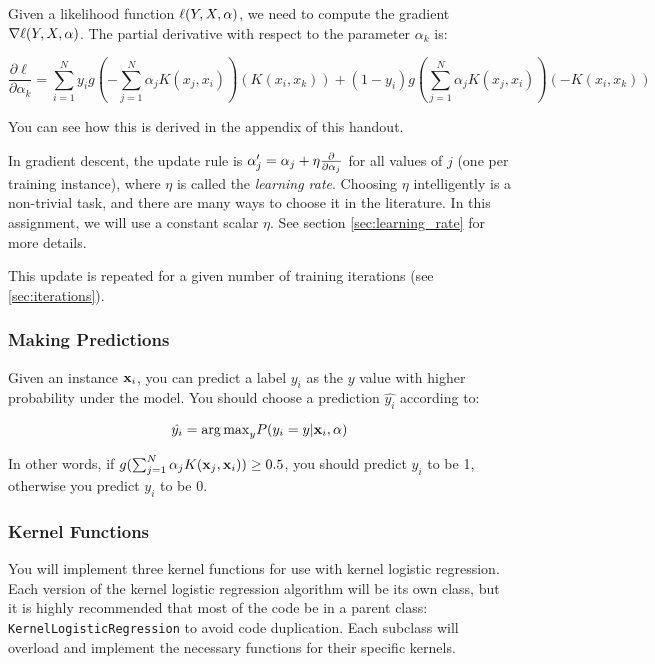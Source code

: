 \documentclass[11pt]{article}
\newcommand{\va}{{\bf \alpha}}
\newcommand{\vx}{{\bf x}}
\newcommand{\vxi}{{\bf x}_i}
\newcommand{\yi}{y_i}
\newcommand{\pder}[2][]{\frac{\partial#1}{\partial#2}}
\newcommand{\code}[1]{{\footnotesize \tt #1}}
\begin{document}
Given a likelihood function $\ell(Y,X,\va)$, we need to compute the gradient $\nabla \ell(Y,X,\va)$. The partial derivative with respect to the parameter $\alpha_k$ is:

\begin{equation}
\pder[\ell]{\alpha_k} = \sum_{i=1}^{N} y_i g\left(-\textstyle \sum_{j=1}^{N} \alpha_j K(x_j, x_i)\right) \left(K(x_i, x_k)\right) 
+ (1 - y_i) g\left(\textstyle \sum_{j=1}^{N} \alpha_j K(x_j, x_i)\right) \left(-K(x_i, x_k)\right) 
\end{equation}

\noindent You can see how this is derived in the appendix of this handout.

In gradient descent, the update rule is $\va'_j = \va_j + \eta \pder{\va_j}$ for all values of $j$ (one per training instance), where $\eta$ is called the {\em learning rate}. Choosing $\eta$ intelligently is a non-trivial task, and there are many ways to choose it in the literature. In this assignment, we will use a constant scalar $\eta$. See section \ref{sec:learning_rate} for more details. 

This update is repeated for a given number of training iterations (see \ref{sec:iterations}).

\subsubsection{Making Predictions}

Given an instance $\vxi$, you can predict a label $\yi$ as the $y$ value with higher probability under the model. You should choose a prediction $\hat{\yi}$ according to:

\begin{equation}
\hat{\yi} = {\arg\max}_{y} P(y_i = y | \vxi, \va)
\end{equation}

In other words, if $g(\sum_{j=1}^N \alpha_j  K(\vx_j, \vx_i)) \ge 0.5$, you should predict $\yi$ to be 1, otherwise you predict $\yi$ to be 0.

\subsubsection{Kernel Functions}

You will implement three kernel functions for use with kernel logistic regression. Each version of the kernel logistic regression algorithm will be its own class, but it is highly recommended that most of the code be in a parent class: \code{KernelLogisticRegression} to avoid code duplication. Each subclass will overload and implement the necessary functions for their specific kernels.
\end{document}
